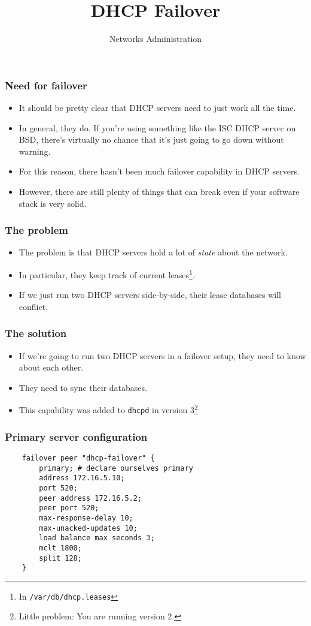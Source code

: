 \documentclass[10pt]{beamer}
\title{DHCP Failover}
\author[IN715]{Networks Administration}
\institute[Otago Polytechnic]{
  Otago Polytechnic \\
  Dunedin, New Zealand \\
}
\date{}
\begin{document}
\begin{frame}[plain]
  \titlepage
\end{frame}

\begin{frame}
	\frametitle{Need for failover}
	\begin{itemize}
	    \item It should be pretty clear that DHCP servers need to just work all the time.
	    \item In general, they do.  If you're using something like the ISC DHCP server on BSD, there's virtually no chance that it's just going to go down without warning.
	    \item For this reason, there hasn't been much failover capability in DHCP servers.
	    \item However, there are still plenty of things that can break even if your software stack is very solid.
	    \end{itemize}
\end{frame}

\begin{frame}
	\frametitle{The problem}
	\begin{itemize}
		\item The problem is that DHCP servers hold a lot of \emph{state} about the network.
		\item In particular, they keep track of current leases\footnote{In \texttt{/var/db/dhcp.leases}}.
			\item If we just run two DHCP servers side-by-side, their lease databases will conflict.
			
	\end{itemize}
\end{frame}

\begin{frame}
	\frametitle{The solution}
	\begin{itemize}
		\item If we're going to run two DHCP servers in a failover setup, they need to know about each other.
		\item They need to sync their databases.
		\item This capability was added to \texttt{dhcpd} in version 3\footnote{Little problem: You are running version 2.}
	\end{itemize}
\end{frame}

\begin{frame}[fragile]
	\frametitle{Primary server configuration}
	\begin{verbatim}
	failover peer "dhcp-failover" {
	    primary; # declare ourselves primary
	    address 172.16.5.10;
	    port 520;
	    peer address 172.16.5.2;
	    peer port 520;
	    max-response-delay 10;
	    max-unacked-updates 10;
	    load balance max seconds 3;
	    mclt 1800;
	    split 128;
	}
	\end{verbatim}
\end{frame}
\end{document}
